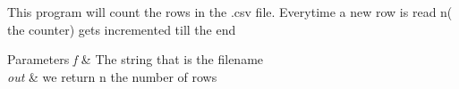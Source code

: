 This program will count the rows in the .csv file. Everytime a new row is read n( the counter) gets incremented till the end 
\begin{DoxyParams}{Parameters}
{\em f} & The string that is the filename \\
\hline
{\em out} & we return n the number of rows \\
\hline
\end{DoxyParams}
